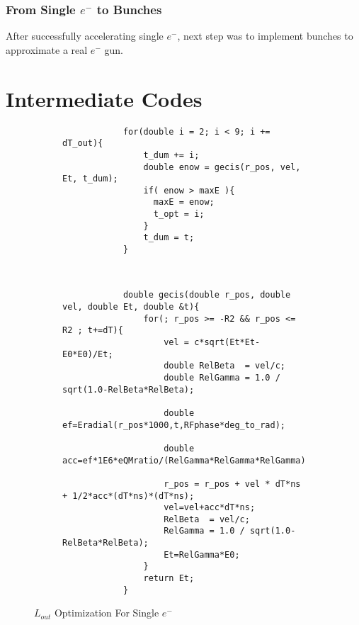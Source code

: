 \documentclass{book}
\begin{document}
\subsection{From Single $e^-$ to Bunches}
After successfully accelerating single $e^-$, next step was to implement bunches to approximate a real $e^-$ gun.


\appendix
\chapter{Intermediate Codes} \label{appendix:intermediate_codes}
\begin{figure}[H]
    \centering
    \begin{subfigure}{\textwidth}
        \centering
        \begin{verbatim}
            for(double i = 2; i < 9; i += dT_out){
                t_dum += i;
                double enow = gecis(r_pos, vel, Et, t_dum);
                if( enow > maxE ){
                  maxE = enow;
                  t_opt = i;
                }
                t_dum = t;
            }
        \end{verbatim}
    \end{subfigure} 
    \\
    \begin{subfigure}{\textwidth}
        \centering
        \begin{verbatim}
            double gecis(double r_pos, double vel, double Et, double &t){
                for(; r_pos >= -R2 && r_pos <= R2 ; t+=dT){
                    vel = c*sqrt(Et*Et-E0*E0)/Et;
                    double RelBeta  = vel/c;
                    double RelGamma = 1.0 / sqrt(1.0-RelBeta*RelBeta);
                
                    double ef=Eradial(r_pos*1000,t,RFphase*deg_to_rad);
                
                    double acc=ef*1E6*eQMratio/(RelGamma*RelGamma*RelGamma); 
                
                    r_pos = r_pos + vel * dT*ns + 1/2*acc*(dT*ns)*(dT*ns);
                    vel=vel+acc*dT*ns;
                    RelBeta  = vel/c;
                    RelGamma = 1.0 / sqrt(1.0-RelBeta*RelBeta);
                    Et=RelGamma*E0; 
                }
                return Et;
            }
        \end{verbatim}
    \end{subfigure}
    \caption{$L_{out}$ Optimization For Single $e^-$}
    \label{fig:lout_opt_single_e}
\end{figure}
\end{document}
